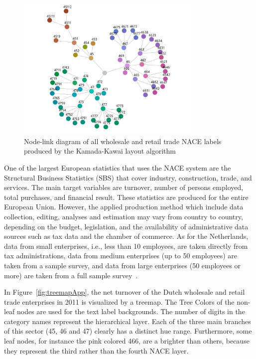 \documentclass[review,journal]{vgtc}         %
\begin{document}
\begin{figure}[!b]
  \centering
  \includegraphics[width=3.5in]{Gbusiness_KK.pdf}
  \caption{Node-link diagram of all wholesale and retail trade NACE labels produced by the Kamada-Kawai layout algorithm}\label{fig:graphKKApp}
\end{figure}

One of the largest European statistics that uses the NACE system are the Structural Business Statistics (SBS) that cover industry, construction, trade, and services. The main target variables are turnover, number of persons employed, total purchases, and financial result. These statistics are produced for the entire European Union. However, the applied production method which include data collection, editing, analyses and estimation may vary from country to country, depending on the budget, legislation, and the availability of administrative data sources such as tax data and the chamber of commerce. As for the Netherlands, data from small enterprises, i.e., less than 10 employees, are taken directly from tax administrations, data from medium enterprises (up to 50 employees) are taken from a sample survey, and data from large enterprises (50 employees or more) are taken from a full sample survey~\cite{cbsSBS}.


In Figure~\ref{fig:treemapApp}, the net turnover of the Dutch wholesale and retail trade enterprises in 2011 is visualized by a treemap. The Tree Colors of the non-leaf nodes are used for the text label backgrounds. The number of digits in the category names represent the hierarchical layer. Each of the three main branches of this sector (45, 46 and 47) clearly has a distinct hue range. Furthermore, some leaf nodes, for instance the pink colored 466, are a brighter than others, because they represent the third rather than the fourth NACE layer.
\end{document}
